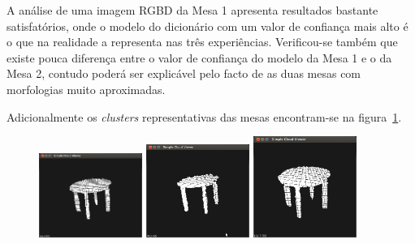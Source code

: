 A análise de uma imagem RGBD da Mesa 1 apresenta resultados bastante satisfatórios, onde o modelo do dicionário com um valor de confiança mais alto é o que na realidade a representa nas três experiências. Verificou-se também que existe pouca diferença entre o valor de confiança do modelo da Mesa 1 e o da Mesa 2, contudo poderá ser explicável pelo facto de as duas mesas com morfologias muito aproximadas.



Adicionalmente os \emph{clusters} representativas das mesas encontram-se na figura~\ref{fig:mesa1_ensaios}.

\begin{figure}[htb]
\begin{center}
	\includegraphics[width=0.30\textwidth]{figures/mesa1_1.png}
	\includegraphics[width=0.30\textwidth]{figures/mesa1_2.png}
	\includegraphics[width=0.30\textwidth]{figures/mesa1_3.png}
	\label{fig:mesa1_ensaios}
\end{center}
\end{figure}

